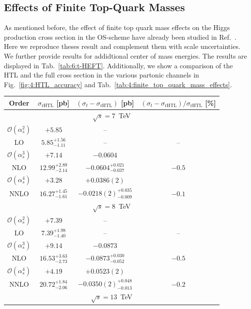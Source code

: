 \subsection{Effects of Finite Top-Quark Masses}
As mentioned before, the effect of finite top quark mass effects on the Higgs production cross section in the \acs{OS}-scheme have already been studied in Ref.~\cite{Czakon:2021yub}. Here we reproduce theses result and complement them with scale uncertainties. We further provide results for addidtional center of mass energies. The results are displayed in Tab.~\ref{tab:6:t-HEFT}. Additionally, we show a comparison of the \acs{HTL} and the full cross section in the various partonic channels in Fig.~\ref{fig:4:HTL_accuracy} and Tab.~\ref{tab:4:finite_top_quark_mass_effects}.
\begin{table}[t]
\centering
\begin{tabular}{cccc}
Order  &  $\sigma_\text{rHTL}$ [pb] & $(\sigma_t - \sigma_\text{rHTL})$ [pb]  &  $(\sigma_t - \sigma_\text{rHTL})/\sigma_\text{rHTL}$ [\%]  \\
\hline
\hline
\multicolumn{4}{c}{$\sqrt{s}=7$~TeV}\\
\hline
$\mathcal{O}(\alpha_s^2)$ & $+5.85$ & -- &  \\
LO & $5.85^{+1.56}_{-1.11}$ & -- & --  \\
\hline
$\mathcal{O}(\alpha_s^3)$ & $+7.14$ & $-0.0604$ &  \\
NLO & $12.99^{+2.89}_{-2.14}$ & $-0.0604^{+0.021}_{-0.037}$ & $-0.5$  \\
\hline
$\mathcal{O}(\alpha_s^4)$ & $+3.28$ & $+0.0386(2)$ &  \\
NNLO & $16.27^{+1.45}_{-1.61}$ & $-0.0218(2)^{+0.035}_{-0.009}$ & $-0.1$  \\
\hline
\hline
\multicolumn{4}{c}{$\sqrt{s}=8$~TeV}\\
\hline
$\mathcal{O}(\alpha_s^2)$ & $+7.39$ & -- &  \\
LO & $7.39^{+1.98}_{-1.40}$ & -- & --  \\
\hline
$\mathcal{O}(\alpha_s^3)$ & $+9.14$ & $-0.0873$ &  \\
NLO & $16.53^{+3.63}_{-2.73}$ & $-0.0873^{+0.030}_{-0.052}$ & $-0.5$  \\
\hline
$\mathcal{O}(\alpha_s^4)$ & $+4.19$ & $+0.0523(2)$ &   \\
NNLO & $20.72^{+1.84}_{-2.06}$ & $-0.0350(2)^{+0.048}_{-0.013}$ & $-0.2$  \\
\hline
\hline
\multicolumn{4}{c}{$\sqrt{s}=13$~TeV}\\

\end{tabular}
\end{table}
